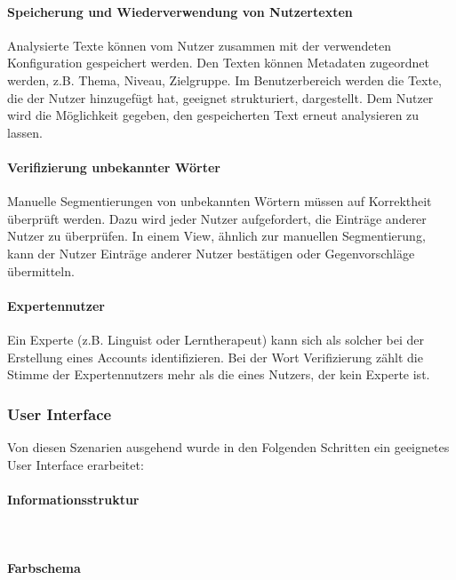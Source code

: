 \paragraph{Speicherung und Wiederverwendung von Nutzertexten}
Analysierte Texte können vom Nutzer zusammen mit der verwendeten Konfiguration gespeichert werden. Den Texten können Metadaten zugeordnet werden, z.B. Thema, Niveau, Zielgruppe. Im Benutzerbereich werden die Texte, die der Nutzer hinzugefügt hat, geeignet strukturiert, dargestellt. Dem Nutzer wird die Möglichkeit gegeben, den gespeicherten Text erneut analysieren zu lassen.

\paragraph{Verifizierung unbekannter Wörter}
Manuelle Segmentierungen von unbekannten Wörtern müssen auf Korrektheit überprüft werden. Dazu wird jeder Nutzer aufgefordert, die Einträge anderer Nutzer zu überprüfen. In einem View, ähnlich zur manuellen Segmentierung, kann der Nutzer Einträge anderer Nutzer bestätigen oder Gegenvorschläge übermitteln.

\paragraph{Expertennutzer}
Ein Experte (z.B. Linguist oder Lerntherapeut) kann sich als solcher bei der Erstellung eines Accounts identifizieren. Bei der Wort Verifizierung zählt die Stimme der Expertennutzers mehr als die eines Nutzers, der kein Experte ist.

\subsubsection{User Interface}
Von diesen Szenarien ausgehend wurde in den Folgenden Schritten ein geeignetes User Interface erarbeitet:

\paragraph{Informationsstruktur}
\\

\paragraph{Farbschema}

